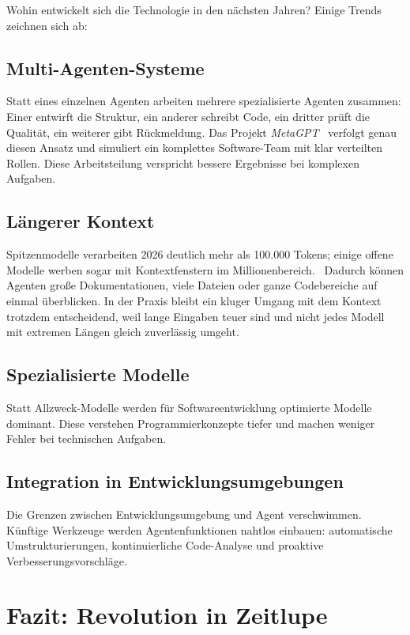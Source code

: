 Wohin entwickelt sich die Technologie in den nächsten Jahren? Einige Trends zeichnen sich ab:

\subsection{Multi-Agenten-Systeme}

Statt eines einzelnen Agenten arbeiten mehrere spezialisierte Agenten zusammen: Einer entwirft die Struktur, ein anderer schreibt Code, ein dritter prüft die Qualität, ein weiterer gibt Rückmeldung. Das Projekt \emph{MetaGPT}~\cite{hong2023metagpt} verfolgt genau diesen Ansatz und simuliert ein komplettes Software-Team mit klar verteilten Rollen. Diese Arbeitsteilung verspricht bessere Ergebnisse bei komplexen Aufgaben.

\subsection{Längerer Kontext}

Spitzenmodelle verarbeiten 2026 deutlich mehr als 100.000 Tokens; einige offene Modelle werben sogar mit Kontextfenstern im Millionenbereich.~\cite{meta2025llama4} Dadurch können Agenten große Dokumentationen, viele Dateien oder ganze Codebereiche auf einmal überblicken. In der Praxis bleibt ein kluger Umgang mit dem Kontext trotzdem entscheidend, weil lange Eingaben teuer sind und nicht jedes Modell mit extremen Längen gleich zuverlässig umgeht.

\subsection{Spezialisierte Modelle}

Statt Allzweck-Modelle werden für Softwareentwicklung optimierte Modelle dominant. Diese verstehen Programmierkonzepte tiefer und machen weniger Fehler bei technischen Aufgaben.

\subsection{Integration in Entwicklungsumgebungen}

Die Grenzen zwischen Entwicklungsumgebung und Agent verschwimmen. Künftige Werkzeuge werden Agentenfunktionen nahtlos einbauen: automatische Umstrukturierungen, kontinuierliche Code-Analyse und proaktive Verbesserungsvorschläge.


\section{Fazit: Revolution in Zeitlupe}

